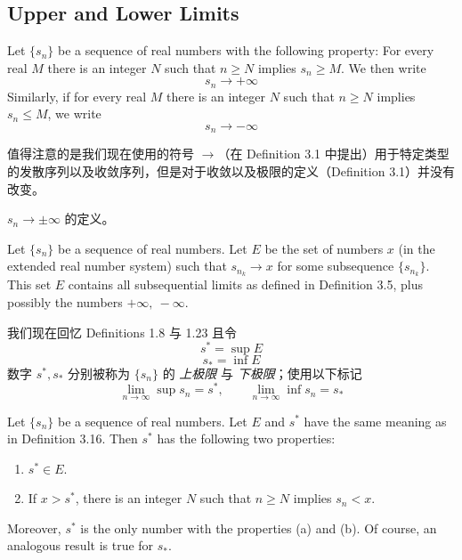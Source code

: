 \documentclass[../poma-notes.tex]{subfiles}
\begin{document}
\subsection*{Upper and Lower Limits}

\begin{definition}
  Let $\{s_n\}$ be a sequence of real numbers with the following property: For every real $M$ there is an integer $N$ such that $n \ge N$
  implies $s_n \ge M$. We then write
  \[ s_n \to + \infty \]
  Similarly, if for every real $M$ there is an integer $N$ such that $n \ge N$ implies $s_n \le M$, we write
  \[ s_n \to - \infty \]
\end{definition}

值得注意的是我们现在使用的符号 $\to$（在 Definition 3.1 中提出）用于特定类型的发散序列以及收敛序列，但是对于收敛以及极限的定义（Definition 3.1）并没有改变。

\anote $s_n \to \pm \infty$ 的定义。

\begin{definition}
  Let $\{s_n\}$ be a sequence of real numbers. Let $E$ be the set of numbers $x$ (in the extended real number system) such that
  $s_{n_k} \to x$ for some subsequence $\{s_{n_k}\}$. This set $E$ contains all subsequential limits as defined in Definition 3.5, plus
  possibly the numbers $+\infty,\ -\infty$.
\end{definition}

我们现在回忆 Definitions 1.8 与 1.23 且令
\[ s^* = \sup E \]
\[ s_* = \inf E \]
数字 $s^*, s_*$ 分别被称为 $\{s_n\}$ 的 \textit{上极限} 与 \textit{下极限}；使用以下标记
\[ \lim_{n \to \infty} \sup s_n = s^*, \qquad \lim_{n \to \infty} \inf s_n = s_* \]

\begin{theorem}
  Let $\{s_n\}$ be a sequence of real numbers. Let $E$ and $s^*$ have the same meaning as in Definition 3.16. Then $s^*$ has the following
  two properties:
  \begin{enumerate}[label=(\alph*)]
    \item $s^* \in E$.
    \item If $x > s^*$, there is an integer $N$ such that $n \ge N$ implies $s_n < x$.
  \end{enumerate}
  Moreover, $s^*$ is the only number with the properties (a) and (b). Of course, an analogous result is true for $s_*$.
\end{theorem}
\end{document}
